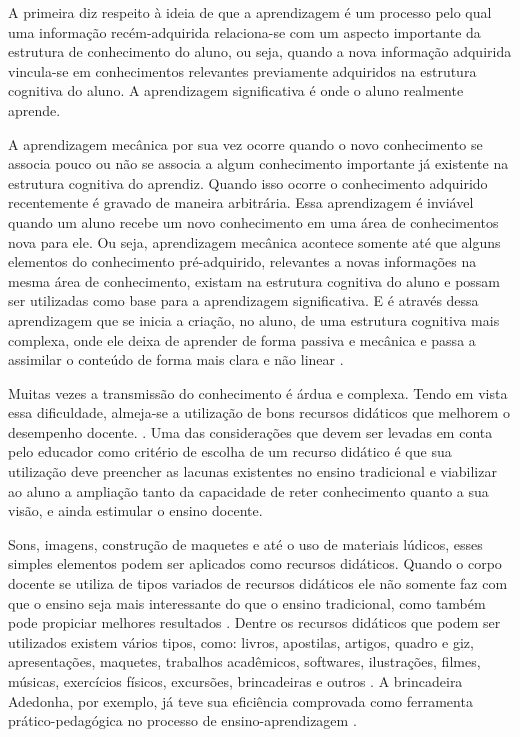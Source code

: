 A primeira diz respeito à ideia de que a aprendizagem é um processo pelo qual uma informação recém-adquirida relaciona-se com um aspecto importante da estrutura de conhecimento do aluno, ou seja, quando a nova informação adquirida vincula-se em conhecimentos relevantes previamente adquiridos na estrutura cognitiva do aluno. A aprendizagem significativa é onde o aluno realmente aprende.

A aprendizagem mecânica por sua vez ocorre quando o novo conhecimento se associa pouco ou não se associa a algum conhecimento importante já existente na estrutura cognitiva do aprendiz. Quando isso ocorre o conhecimento adquirido recentemente é gravado de maneira arbitrária. Essa aprendizagem é inviável quando um aluno recebe um novo conhecimento em uma área de conhecimentos nova para ele. Ou seja, aprendizagem mecânica acontece somente até que alguns elementos do conhecimento pré-adquirido, relevantes a novas informações na mesma área de conhecimento, existam na estrutura cognitiva do aluno e possam ser utilizadas como base para a aprendizagem significativa. E é através dessa aprendizagem que se inicia a criação, no aluno, de uma estrutura cognitiva mais complexa, onde ele deixa de aprender de forma passiva e mecânica e passa a assimilar o conteúdo de forma mais clara e não linear \cite{ausubel80}.

Muitas vezes a transmissão do conhecimento é árdua e complexa. Tendo em vista essa dificuldade, almeja-se a utilização de bons recursos didáticos que melhorem o desempenho docente. \cite{souza07}. Uma das considerações que devem ser levadas em conta pelo educador como critério de escolha de um recurso didático é que sua utilização deve preencher as lacunas existentes no ensino tradicional e viabilizar ao aluno a ampliação 
tanto da capacidade de reter conhecimento quanto a sua visão, e ainda estimular o ensino docente. \cite{trivelato06}

Sons, imagens, construção de maquetes e até o uso de materiais lúdicos, esses simples elementos podem ser aplicados como recursos didáticos. Quando o corpo docente se utiliza de tipos variados de recursos didáticos ele não somente faz com que o ensino seja mais interessante do que o ensino tradicional, como também pode propiciar melhores resultados \cite{parra85} \cite{souza07} \cite{costoldi09}. Dentre os recursos didáticos que podem ser utilizados existem vários tipos, como: livros, apostilas, artigos, quadro e giz, apresentações, maquetes, trabalhos acadêmicos, softwares, ilustrações, filmes, músicas, exercícios físicos, excursões, brincadeiras e outros \cite{ferreira07}. A brincadeira Adedonha, por exemplo, já teve sua eficiência comprovada como ferramenta prático-pedagógica no processo de ensino-aprendizagem \cite{silva18}.

